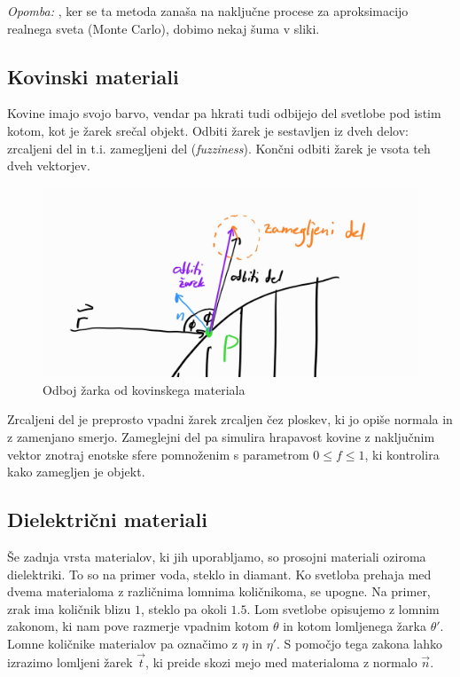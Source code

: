 \documentclass[12pt, a4paper]{article}
\begin{document}
\textit{Opomba: }, ker se ta metoda zanaša na naključne procese za aproksimacijo realnega sveta (Monte Carlo),
dobimo nekaj šuma v sliki.

\subsection{Kovinski materiali}

Kovine imajo svojo barvo, vendar pa hkrati tudi odbijejo del svetlobe pod istim kotom, kot je
žarek srečal objekt. Odbiti žarek je sestavljen iz dveh delov: zrcaljeni del in t.i. zamegljeni del
(\textit{fuzziness}). Končni odbiti žarek je vsota teh dveh vektorjev.

\begin{figure}[H]
	\centering
	\includegraphics[width=400pt]{metal}
	\caption{Odboj žarka od kovinskega materiala}
\end{figure}

Zrcaljeni del je preprosto vpadni žarek zrcaljen čez ploskev, ki jo opiše normala in z zamenjano smerjo.
Zameglejni del pa simulira hrapavost kovine z naključnim vektor znotraj enotske sfere pomnoženim
s parametrom $0 \leq f \leq 1$, ki kontrolira kako zamegljen je objekt.

\subsection{Dielektrični materiali}
Še zadnja vrsta materialov, ki jih uporabljamo, so prosojni materiali oziroma dielektriki. To so na primer voda,
steklo in diamant. Ko svetloba prehaja med dvema materialoma z različnima lomnima količnikoma, se upogne.
Na primer, zrak ima količnik blizu $1$, steklo pa okoli $1.5$. Lom svetlobe opisujemo z lomnim zakonom, ki nam
pove razmerje vpadnim kotom $\theta$ in kotom lomljenega žarka $\theta'$. Lomne količnike materialov pa označimo
z $\eta$ in $\eta'$. S pomočjo tega zakona lahko izrazimo lomljeni žarek $\vec{t}$, ki preide skozi mejo med materialoma
z normalo $\vec{n}$.
\end{document}
